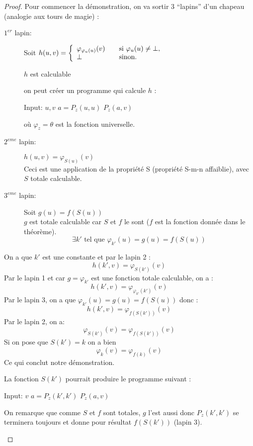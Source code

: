 \begin{proof}
Pour commencer la démonstration, on va sortir 3 ``lapins'' d'un chapeau (analogie aux tours de magie) :
\begin{description}

	\item[$1^{er}$ lapin:] Soit $ h(u,v) = \left\{
	\begin{array}{l l}
		\varphi_{\varphi_{u}(u)}(v) & \quad \text{si }\varphi_u(u)\neq \bot,\\
    	\bot & \quad \text{sinon}.
	\end{array} \right.$

		$h$ est calculable
		\begin{myrem}
			on peut créer un programme qui calcule $h$ :
            \begin{algorithmic}
              \STATE Input: $u,v$
              \STATE $a = P_z(u,u)$
              \STATE $P_z(a,v)$
            \end{algorithmic}
            où $\varphi_z = \theta$ est la fonction universelle.
		\end{myrem}

	\item[$2^{eme}$ lapin:] $h(u,v)=\varphi_{S(u)}(v)$\\
	Ceci est une application de la propriété S (propriété S-m-n affaiblie), avec $S$ totale calculable.

	\item[$3^{eme}$ lapin:] Soit $g(u)=f(S(u))$\\
	 $g$ est totale calculable car $S$ et $f$ le sont ($f$
		est la fonction donnée dans le théorème).
		\[ \exists k' \text{ tel que } \varphi_{k'}(u) =g(u)=f(S(u)) \]
\end{description}
On a que $k'$ est une constante et par le lapin 2 :
\[h(k',v) = \varphi_{S(k')}(v)\]
Par le lapin 1 et car $g=\varphi_{k'}$ est une fonction totale calculable, on a :
\[h(k',v) = \varphi_{\varphi_{k'}(k')}(v)\]
Par le lapin 3, on a que $\varphi_{k'}(u) = g(u)=f(S(u))$ donc :
\[h(k',v) = \varphi_{f(S(k'))}(v)\]
Par le lapin 2, on a:
\[ \varphi_{S(k')}(v) =\varphi_{f(S(k'))}(v) \]
Si on pose que $S(k')=k$ on a bien
\[ \varphi_{k}(v) = \varphi_{f(k)}(v) \]
Ce qui conclut notre démonstration.
		\begin{myrem}
          La fonction $S(k')$ pourrait produire le programme suivant :
          \begin{algorithmic}
            \STATE Input: $v$
            \STATE $a = P_z(k',k')$
            \STATE $P_z(a,v)$
          \end{algorithmic}
          On remarque que comme $S$ et $f$ sont totales,
          $g$ l'est aussi donc $P_z(k',k')$ se terminera toujours et donne pour résultat $f(S(k'))$ (lapin 3).


\end{myrem}
\end{proof}
